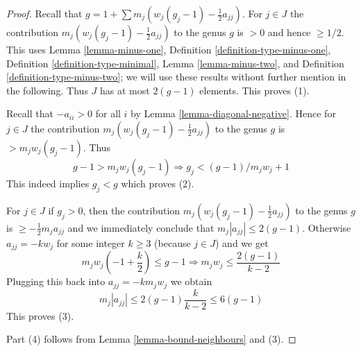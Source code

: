 \documentclass[10pt,a4paper]{amsart}
\theoremstyle{plain}
\theoremstyle{definition}
\theoremstyle{remark}
\numberwithin{equation}{subsection}
\begin{document}
\begin{proof}
Recall that $g = 1 + \sum m_j(w_j(g_j - 1) - \frac{1}{2} a_{jj})$.
For $j \in J$ the contribution $m_j(w_j(g_j - 1) - \frac{1}{2} a_{jj})$
to the genus $g$ is $> 0$ and hence $\geq 1/2$. This uses
Lemma \ref{lemma-minus-one},
Definition \ref{definition-type-minus-one},
Definition \ref{definition-type-minimal},
Lemma \ref{lemma-minus-two}, and
Definition \ref{definition-type-minus-two}; we will use these
results without further mention in the following.
Thus $J$ has at most $2(g - 1)$ elements.
This proves (1).

\medskip\noindent
Recall that $-a_{ii} > 0$ for all $i$ by Lemma \ref{lemma-diagonal-negative}.
Hence for $j \in J$ the contribution $m_j(w_j(g_j - 1) - \frac{1}{2} a_{jj})$
to the genus $g$ is $> m_jw_j(g_j - 1)$. Thus
$$
g - 1 > m_jw_j(g_j - 1) \Rightarrow g_j < (g - 1)/m_jw_j + 1
$$
This indeed implies $g_j < g$ which proves (2).

\medskip\noindent
For $j \in J$ if $g_j > 0$, then the contribution
$m_j(w_j(g_j - 1) - \frac{1}{2} a_{jj})$ to the genus $g$
is $\geq -\frac{1}{2}m_ja_{jj}$ and we immediately conclude
that $m_j|a_{jj}| \leq 2(g - 1)$. Otherwise $a_{jj} = -kw_j$
for some integer $k \geq 3$ (because $j \in J$) and we get
$$
m_jw_j(-1 + \frac{k}{2}) \leq g - 1
\Rightarrow
m_jw_j \leq \frac{2(g - 1)}{k - 2}
$$
Plugging this back into $a_{jj} = -km_jw_j$ we obtain
$$
m_j|a_{jj}| \leq 2(g - 1) \frac{k}{k - 2} \leq 6(g - 1)
$$
This proves (3).

\medskip\noindent
Part (4) follows from Lemma \ref{lemma-bound-neighbours} and (3).
\end{proof}
\end{document}
